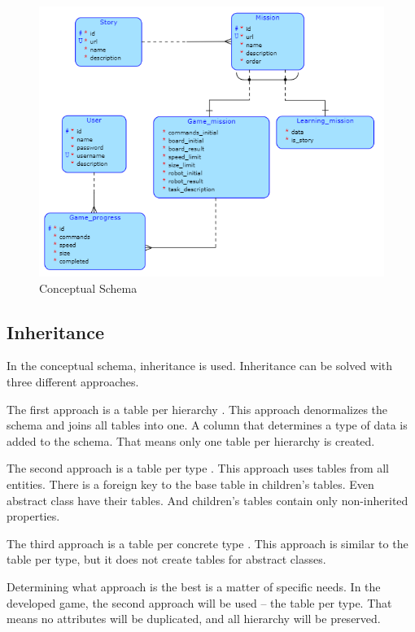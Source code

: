 \begin{figure}
    \centering
    \includegraphics[width=1\linewidth]{assets/design/conceptualdiagram.png}
    \caption{Conceptual Schema}
    \label{fig:design:conceptualschema}
\end{figure}

\subsection{Inheritance}

In the conceptual schema, inheritance is used.
Inheritance can be solved with three different approaches.

The first approach is a table per hierarchy \cite{a2010_enterprise}.
This approach denormalizes the schema and joins all tables into one.
A column that determines a type of data is added to the schema.
That means only one table per hierarchy is created.

The second approach is a table per type \cite{a2010_enterprise}.
This approach uses tables from all entities.
There is a foreign key to the base table in children's tables.
Even abstract class have their tables.
And children's tables contain only non-inherited properties.

The third approach is a table per concrete type \cite{a2010_enterprise}.
This approach is similar to the table per type, but it does not create tables for abstract classes.

Determining what approach is the best is a matter of specific needs.
In the developed game, the second approach will be used -- the table per type.
That means no attributes will be duplicated, and all hierarchy will be preserved.
